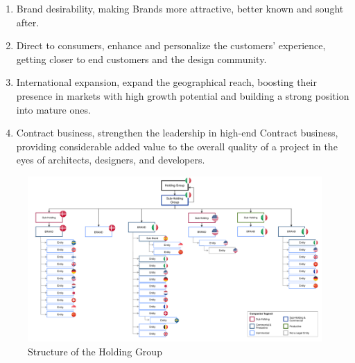 \documentclass[12pt,a4paper,openright,twoside]{book}
\begin{document}
\begin{enumerate}
    \item Brand desirability, making Brands more attractive, better known and sought after.
    \item Direct to consumers, enhance and personalize the customers’ experience, getting closer to end customers and the design community.
    \item International expansion, expand the geographical reach, boosting their presence in markets with high growth potential and building a strong position into mature ones.
    \item Contract business, strengthen the leadership in high-end Contract business, providing considerable added value to the overall quality of a project in the eyes of architects, designers, and developers.
\end{enumerate}

\begin{figure}[h]
	\centering
	\includegraphics[width=\linewidth]{figures/structure.pdf}
	\caption{Structure of the Holding Group}
	\label{fig:structure}
\end{figure}
\end{document}
